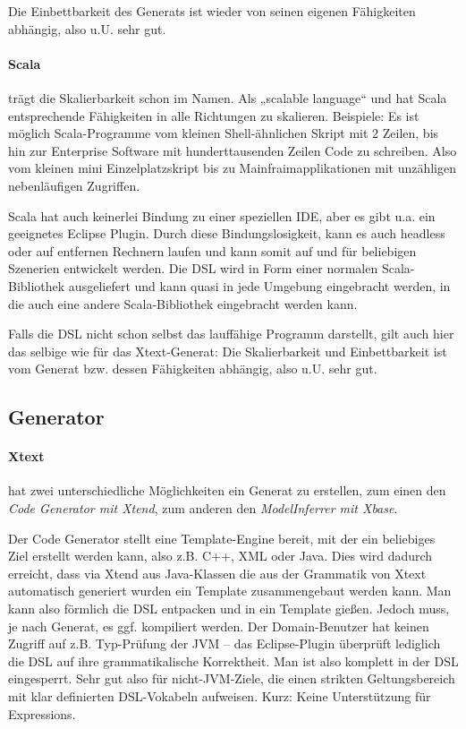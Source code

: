 Die Einbettbarkeit des Generats ist wieder von seinen eigenen Fähigkeiten
abhängig, also u.U. sehr gut.

\paragraph{Scala} trägt die Skalierbarkeit schon im Namen. Als
„scalable language“ und hat Scala entsprechende Fähigkeiten in alle Richtungen
zu skalieren. Beispiele: Es ist möglich Scala-Programme vom kleinen
Shell-ähnlichen Skript mit 2 Zeilen, bis hin zur Enterprise Software
mit hunderttausenden Zeilen Code zu schreiben. Also vom kleinen mini
Einzelplatzskript bis zu Mainfraimapplikationen mit unzähligen nebenläufigen
Zugriffen.

Scala hat auch keinerlei Bindung zu einer speziellen IDE, aber es gibt
u.a. ein geeignetes Eclipse Plugin. Durch diese Bindungslosigkeit, kann
es auch headless oder auf entfernen Rechnern laufen und kann somit auf und für
beliebigen Szenerien entwickelt werden.
Die DSL wird in Form einer normalen Scala-Bibliothek ausgeliefert und
kann quasi in jede Umgebung eingebracht werden, in die auch eine andere
Scala-Bibliothek eingebracht werden kann.

Falls die DSL nicht schon selbst das lauffähige Programm darstellt, gilt
auch hier das selbige wie für das Xtext-Generat: Die Skalierbarkeit und
Einbettbarkeit ist vom Generat bzw. dessen Fähigkeiten abhängig, also u.U.
sehr gut.


\subsection{Generator}\label{sec-generator}

\paragraph{Xtext} hat zwei unterschiedliche Möglichkeiten ein
Generat zu erstellen, zum einen den \emph{Code Generator mit Xtend},
zum anderen den \emph{ModelInferrer mit Xbase}.

Der Code Generator stellt eine Template-Engine bereit, mit der
ein beliebiges Ziel erstellt werden kann, also z.B. C++, XML oder Java.
Dies wird dadurch erreicht, dass via Xtend aus Java-Klassen die aus der
Grammatik von Xtext automatisch generiert wurden ein Template zusammengebaut
werden kann. Man kann also förmlich die DSL entpacken und in ein Template
gießen.
Jedoch muss, je nach Generat, es ggf. kompiliert werden. Der
Domain-Benutzer hat keinen Zugriff auf z.B. Typ-Prüfung der JVM --
das Eclipse-Plugin überprüft lediglich die DSL auf ihre
grammatikalische Korrektheit. Man ist also komplett in der DSL eingesperrt.
Sehr gut also für nicht-JVM-Ziele, die einen strikten Geltungsbereich mit
klar definierten DSL-Vokabeln aufweisen. Kurz: Keine Unterstützung für
Expressions.\cite{xtext}

